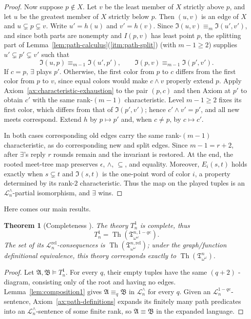 \documentclass{amsart}
\newtheorem{theorem}{Theorem}
\theoremstyle{definition}
\begin{document}
\begin{proof}
    Now suppose $p\notin X$. Let $v$ be the least member of $X$ strictly above $p$, and let $u$ be the greatest member of $X$ strictly below $p$. Then $(u,v)$ is an edge of $X$ and $u\subsetneq p\subsetneq v$. Write $u'=h(u)$ and $v'=h(v)$. Since $\mathfrak I(u,v)\equiv_m\mathfrak I(u',v')$, and since both parts are nonempty and $I(p,v)$ has least point $p$, the splitting part of Lemma~\ref{lem:path-calculus}(\ref{itm:path-split}) (with $m-1\geq2$) supplies $u'\subsetneq p'\subsetneq v'$ such that
    $$\mathfrak I(u,p)\equiv_{m-1}\mathfrak I(u',p'),\qquad\mathfrak I(p,v)\equiv_{m-1}\mathfrak I(p',v').$$
    If $c=p$, $\exists$ plays $p'$. Otherwise, the first color from $p$ to $c$ differs from the first color from $p$ to $v$, since equal colors would make $c\wedge v$ properly extend $p$. Apply Axiom~\ref{ax:characteristic-exhaustion} to the pair $(p,c)$ and then Axiom \MakeUppercase{} at $p'$ to obtain $c'$ with the same rank-$(m-1)$ characteristic. Level $m-1\geq2$ fixes its first color, which differs from that of $\mathfrak I(p',v')$; hence $c'\wedge v'=p'$, and all new meets correspond. Extend $h$ by $p\mapsto p'$ and, when $c\neq p$, by $c\mapsto c'$.

    In both cases corresponding old edges carry the same rank-$(m-1)$ characteristic, as do corresponding new and split edges. Since $m-1=r+2$, after $\exists$'s reply $r$ rounds remain and the invariant is restored. At the end, the rooted meet-tree map preserves $\epsilon$, $\wedge$, $\subseteq$, and equality. Moreover, $E_i(s,t)$ holds exactly when $s\subsetneq t$ and $\mathfrak I(s,t)$ is the one-point word of color $i$, a property determined by its rank-$2$ characteristic. Thus the map on the played tuples is an $\mathcal L_n^\wedge$-partial isomorphism, and $\exists$ wins.
\end{proof}

Here comes our main results.

\begin{theorem}[Completeness \MakeUppercase{}]\label{thm:tree-completeness1}
    The theory $T_n^1$ is complete, thus
    $$T_n^1=\operatorname{Th}(\mathfrak T_{\omega^\omega}^{n,1-qe}).$$
    The set of its $\mathcal L_n^{\mathrm{rel}}$-consequences is $\operatorname{Th}(\mathfrak T_{\omega^\omega}^{n,\mathrm{rel}})$; under the graph/function definitional equivalence, this theory corresponds exactly to $\operatorname{Th}(\mathfrak T_{\omega^\omega}^n)$.
\end{theorem}
\begin{proof}
    Let $\mathfrak A,\mathfrak B\models T_n^1$. For every $q$, their empty tuples have the same $(q+2)$ \MakeUppercase{}-diagram, consisting only of the root and having no edges. Lemma~\ref{lem:composition1} gives $\mathfrak A\equiv_q\mathfrak B$ in $\mathcal L_n^\wedge$ for every $q$. Given an $\mathcal L_n^{1-qe}$-sentence, Axiom~\ref{ax:path-definitions} expands its finitely many path predicates into an $\mathcal L_n^\wedge$-sentence of some finite rank, so $\mathfrak A\equiv\mathfrak B$ in the expanded language.
\end{proof}
\end{document}
